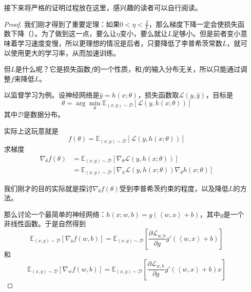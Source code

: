 接下来将严格的证明过程放在这里，感兴趣的读者可以自行阅读。
\begin{proof}

    我们刚才得到了重要定理：如果$0<\eta<\frac{2}{L}$，那么梯度下降一定会使损失函数下降（）。为了做到这一点，要么让$\eta$变小，要么就让$L$足够小。但是前者变小意味着学习速度变慢，所以更理想的情况是后者，只要降低了李普希茨常数$L$，就可以使用更大的学习率，从而加速训练。

    但$L$是什么呢？它是损失函数$f$的一个性质，和$f$的输入分布无关，所以只能通过调整$f$来降低$L$。

    以监督学习为例。设神经网络是$\hat{y} = h(x;\theta)$，损失函数取$\mathcal{L}(y,\hat{y})$，目标是
    \begin{equation}
        \theta = \arg\min_\theta \mathbb{E}_{(x,y) \sim \mathcal{D}} \left[\mathcal{L}(y, h(x;\theta))\right]
    \end{equation}
    其中$\mathcal{D}$是数据分布。

    实际上这玩意就是
    \begin{equation}
        f(\theta) = \mathbb{E}_{(x,y) \sim \mathcal{D}} \left[\mathcal{L}(y, h(x;\theta))\right]
    \end{equation}
    求梯度
    \begin{align}
        \nabla_\theta f(\theta) &= \mathbb{E}_{(x,y) \sim \mathcal{D}} \left[\nabla_\theta \mathcal{L}(y, h(x;\theta))\right] \\
        &= \mathbb{E}_{(x,y) \sim \mathcal{D}} \left[\nabla_h \mathcal{L}(y, h(x;\theta))\nabla_\theta h(x ; \theta)\right]
    \end{align}

    我们刚才的目的实际就是探讨$\nabla_\theta f(\theta)$受到李普希茨约束的程度，以及降低$L$的方法。

    那么讨论一个最简单的神经网络：$h(x; w, b) = g(\left\langle w, x \right\rangle + b)$，其中$g$是一个非线性函数。于是自然得到
    \begin{equation}\label{eq:grad_b}
        \mathbb{E}_{(x,y) \sim \mathcal{D}}[\nabla_b f(w, b)] = \mathbb{E}_{(x,y) \sim \mathcal{D}}\left[\frac{\partial \mathcal{L}_{w, b}}{\partial g}g'(\left\langle w, x \right\rangle + b)\right]
    \end{equation}
    和
    \begin{equation}\label{eq:grad_w}
        \mathbb{E}_{(x,y) \sim \mathcal{D}}[\nabla_w f(w, b)] = \mathbb{E}_{(x,y) \sim \mathcal{D}}\left[\frac{\partial \mathcal{L}_{w, b}}{\partial g}g'(\left\langle w, x \right\rangle + b) x\right]
    \end{equation}


\end{proof}
